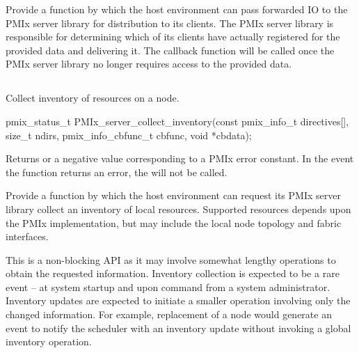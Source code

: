 \descr

Provide a function by which the host environment can pass forwarded \ac{IO} to the \ac{PMIx} server library for distribution to its clients. The \ac{PMIx} server library is responsible for determining which of its clients have actually registered for the provided data and delivering it. The  callback function will be called once the \ac{PMIx} server library no longer requires access to the provided data.

\subsection{}

\summary

Collect inventory of resources on a node.

\format

\cspecificstart
\begin{codepar}
pmix_status_t
PMIx_server_collect_inventory(const pmix_info_t directives[],
                              size_t ndirs,
                              pmix_info_cbfunc_t cbfunc,
                              void *cbdata);
\end{codepar}
\cspecificend

\begin{arglist}
\end{arglist}

Returns  or a negative value corresponding to a PMIx error constant. In the event the function returns an error, the  will not be called.

\descr

Provide a function by which the host environment can request its \ac{PMIx} server library collect an inventory of local resources. Supported resources depends upon the \ac{PMIx} implementation, but may include the local node topology and fabric interfaces.

\advicermstart
This is a non-blocking \ac{API} as it may involve somewhat lengthy operations to obtain the requested information. Inventory collection is expected to be a rare event – at system startup and upon command from a system administrator. Inventory updates are expected to initiate a smaller operation involving only the changed information. For example, replacement of a node would generate an event to notify the scheduler with an inventory update without invoking a global inventory operation.
\advicermend

